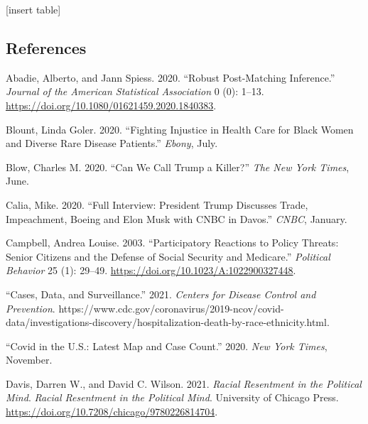 \documentclass[
  12pt,
]{article}
\newlength{\cslhangindent}
\newlength{\cslentryspacingunit} %
\newenvironment{CSLReferences}[2] %
 {%
  \setlength{\parindent}{0pt}
  \ifodd #1
  \let\oldpar\par
  \def\par{\hangindent=\cslhangindent\oldpar}
  \fi
  \setlength{\parskip}{#2\cslentryspacingunit}
 }%
 {}
\begin{document}
{[}insert table{]}

\newpage

\hypertarget{references}{%
\subsection*{References}\label{references}}

\hypertarget{refs}{}
\begin{CSLReferences}{1}{0}
\leavevmode{}%
Abadie, Alberto, and Jann Spiess. 2020. {``Robust {Post-Matching Inference}.''} \emph{Journal of the American Statistical Association} 0 (0): 1--13. \url{https://doi.org/10.1080/01621459.2020.1840383}.

\leavevmode{}%
Blount, Linda Goler. 2020. {``Fighting {Injustice} in {Health Care} for {Black Women} and {Diverse Rare Disease Patients}.''} \emph{Ebony}, July.

\leavevmode{}%
Blow, Charles M. 2020. {``Can {We Call Trump} a {Killer}?''} \emph{The New York Times}, June.

\leavevmode{}%
Calia, Mike. 2020. {``Full Interview: {President Trump} Discusses Trade, Impeachment, {Boeing} and {Elon Musk} with {CNBC} in {Davos}.''} \emph{CNBC}, January.

\leavevmode{}%
Campbell, Andrea Louise. 2003. {``Participatory {Reactions} to {Policy Threats}: {Senior Citizens} and the {Defense} of {Social Security} and {Medicare}.''} \emph{Political Behavior} 25 (1): 29--49. \url{https://doi.org/10.1023/A:1022900327448}.

\leavevmode{}%
{``Cases, {Data}, and {Surveillance}.''} 2021. \emph{Centers for Disease Control and Prevention}. https://www.cdc.gov/coronavirus/2019-ncov/covid-data/investigations-discovery/hospitalization-death-by-race-ethnicity.html.

\leavevmode{}%
{``Covid in the {U}.{S}.: {Latest Map} and {Case Count}.''} 2020. \emph{New York Times}, November.

\leavevmode{}%
Davis, Darren W., and David C. Wilson. 2021. \emph{Racial {Resentment} in the {Political Mind}}. \emph{Racial Resentment in the Political Mind}. {University of Chicago Press}. \url{https://doi.org/10.7208/chicago/9780226814704}.


\end{CSLReferences}
\end{document}
